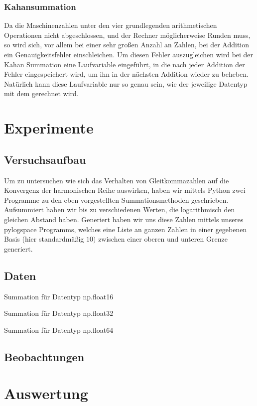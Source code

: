 \documentclass{scrartcl}
\begin{document}
\subsubsection{Kahansummation}
Da die Maschinenzahlen unter den vier grundlegenden arithmetischen Operationen
nicht abgeschlossen, und der Rechner möglicherweise Runden muss, so wird sich,
vor allem bei einer sehr großen Anzahl an Zahlen, bei der Addition ein
Genauigkeitsfehler einschleichen.
Um diesen Fehler auszugleichen wird bei der Kahan Summation eine Laufvariable
eingeführt, in die nach jeder Addition der Fehler eingespeichert wird, um ihn
in der nächsten Addition wieder zu beheben.
Natürlich kann diese Laufvariable nur so genau sein, wie der jeweilige Datentyp
mit dem gerechnet wird.

\section{Experimente}
\subsection{Versuchsaufbau}
Um zu untersuchen wie sich das Verhalten von Gleitkommazahlen auf die
Konvergenz der harmonischen Reihe auswirken, haben wir mittels Python zwei
Programme zu den eben vorgestellten Summationsmethoden geschrieben.
Aufsummiert haben wir bis zu verschiedenen Werten, die logarithmisch den
gleichen Abstand haben.
Generiert haben wir uns diese Zahlen mittels unseres pylogspace Programms,
welches eine Liste an ganzen Zahlen in einer gegebenen Basis (hier
standardmäßig \(10)\) zwischen einer oberen und unteren Grenze generiert.

\subsection{Daten}

Summation für Datentyp np.float16

Summation für Datentyp
np.float32

Summation für Datentyp np.float64

\subsection{Beobachtungen}

\section{Auswertung}
\end{document}
